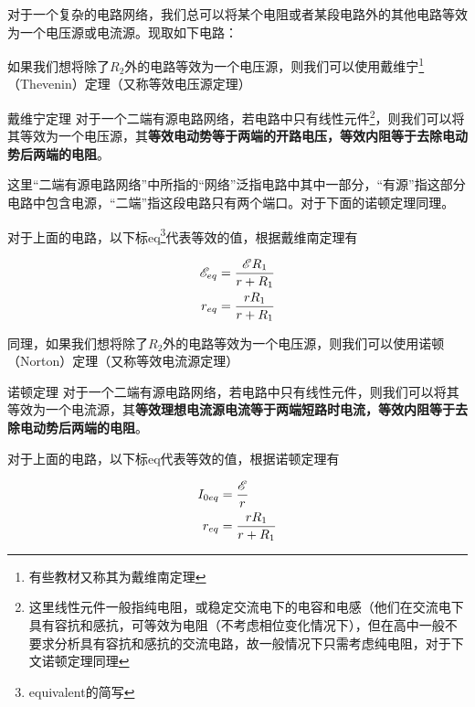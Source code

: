 对于一个复杂的电路网络，我们总可以将某个电阻或者某段电路外的其他电路等效为一个电压源或电流源。现取如下电路：



如果我们想将除了$R_2$外的电路等效为一个电压源，则我们可以使用戴维宁\footnote{有些教材又称其为戴维南定理}（Thevenin）定理（又称等效电压源定理）

\begin{theo}[label=dwndl]{戴维宁定理}{}
对于一个二端有源电路网络，若电路中只有线性元件\footnote{这里线性元件一般指纯电阻，或稳定交流电下的电容和电感（他们在交流电下具有容抗和感抗，可等效为电阻（不考虑相位变化情况下），但在高中一般不要求分析具有容抗和感抗的交流电路，故一般情况下只需考虑纯电阻，对于下文诺顿定理同理}，则我们可以将其等效为一个电压源，其\textbf{等效电动势等于两端的开路电压，等效内阻等于去除电动势后两端的电阻}。

这里“二端有源电路网络”中所指的“网络”泛指电路中其中一部分，“有源”指这部分电路中包含电源，“二端”指这段电路只有两个端口。对于下面的诺顿定理同理。
\end{theo}

对于上面的电路，以下标eq\footnote{equivalent的简写}代表等效的值，根据戴维南定理有



\begin{subequations}
\begin{align*}
\mathscr{E}_{eq} &= \frac{\mathscr{E} R_1}{r + R_1} \\
r_{eq} &= \frac{r R_1}{r + R_1}
\end{align*}
\end{subequations}

同理，如果我们想将除了$R_2$外的电路等效为一个电压源，则我们可以使用诺顿（Norton）定理（又称等效电流源定理）

\begin{theo}{诺顿定理}{}
对于一个二端有源电路网络，若电路中只有线性元件，则我们可以将其等效为一个电流源，其\textbf{等效理想电流源电流等于两端短路时电流，等效内阻等于去除电动势后两端的电阻}。
\end{theo}

对于上面的电路，以下标eq代表等效的值，根据诺顿定理有



\begin{subequations}
\begin{align*}
I_{0 eq} &= \frac{\mathscr{E}}{r} \\
r_{eq} &= \frac{r R_1}{r + R_1}
\end{align*}
\end{subequations}

